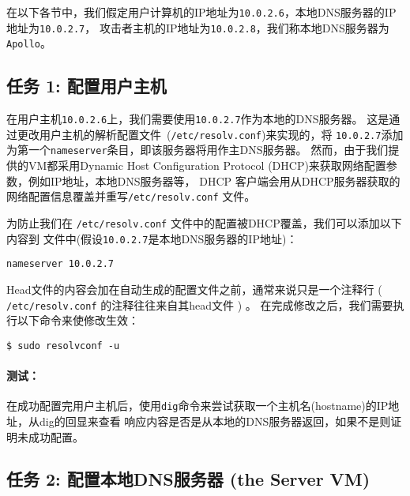 在以下各节中，我们假定用户计算机的IP地址为{\tt 10.0.2.6}，本地DNS服务器的IP地址为{\tt 10.0.2.7}，
攻击者主机的IP地址为{\tt 10.0.2.8}，我们称本地DNS服务器为\texttt{Apollo}。



\subsection{任务 1: 配置用户主机} 
\label{subsec:user_machine}


在用户主机{\tt 10.0.2.6}上，我们需要使用{\tt 10.0.2.7}作为本地的DNS服务器。
这是通过更改用户主机的解析配置文件~(\texttt{/etc/resolv.conf})来实现的，将
\texttt{10.0.2.7}添加为第一个\texttt{nameserver}条目，即该服务器将用作主DNS服务器。
然而，由于我们提供的VM都采用Dynamic Host Configuration Protocol (DHCP)来获取网络配置参数，例如IP地址，本地DNS服务器等，
DHCP 客户端会用从DHCP服务器获取的网络配置信息覆盖并重写\texttt{/etc/resolv.conf} 文件。


为防止我们在 \texttt{/etc/resolv.conf} 文件中的配置被DHCP覆盖，我们可以添加以下内容到
文件中(假设\texttt{10.0.2.7}是本地DNS服务器的IP地址)：


\begin{lstlisting}
nameserver 10.0.2.7
\end{lstlisting}


Head文件的内容会加在自动生成的配置文件之前，通常来说只是一个注释行 ( \texttt{/etc/resolv.conf} 的注释往往来自其head文件 ) 。
在完成修改之后，我们需要执行以下命令来使修改生效：

\begin{lstlisting}
$ sudo resolvconf -u
\end{lstlisting}



\paragraph{测试：}

在成功配置完用户主机后，使用\texttt{dig}命令来尝试获取一个主机名(hostname)的IP地址，从dig的回显来查看
响应内容是否是从本地的DNS服务器返回，如果不是则证明未成功配置。



\subsection{任务 2: 配置本地DNS服务器 (the Server VM)} 


